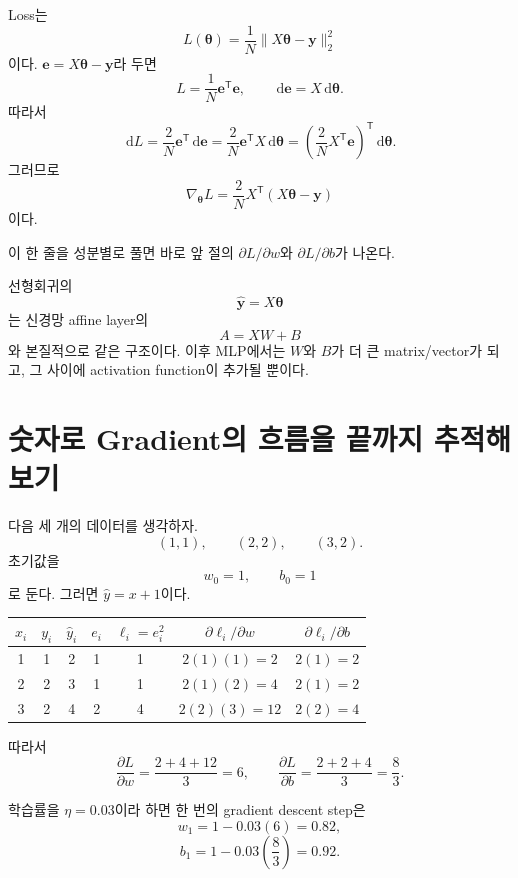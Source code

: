 \documentclass[11pt,a4paper]{article}
\newcommand{\grad}{\nabla}
\newcommand{\vect}[1]{\bm{#1}}
\newcommand{\T}{^{\mathsf T}}
\newcommand{\dd}{\,\mathrm d}
\begin{document}
Loss는
\[
L(\vect{\theta})
=
\frac1N\|X\vect{\theta}-\vect{y}\|_2^2
\]
이다. $\vect{e}=X\vect{\theta}-\vect{y}$라 두면
\[
L=\frac1N\vect{e}\T\vect{e},
\qquad
\dd\vect{e}=X\dd\vect{\theta}.
\]
따라서
\[
\dd L
=
\frac{2}{N}\vect{e}\T\dd\vect{e}
=
\frac{2}{N}\vect{e}\T X\dd\vect{\theta}
=
\left(\frac{2}{N}X\T\vect{e}\right)\T\dd\vect{\theta}.
\]
그러므로
\[
\boxed{
\grad_{\vect{\theta}}L
=
\frac{2}{N}X\T(X\vect{\theta}-\vect{y})
}
\]
이다.

이 한 줄을 성분별로 풀면 바로 앞 절의 $\partial L/\partial w$와 $\partial L/\partial b$가 나온다.

\begin{mlbox}[다음 단계와의 연결]
선형회귀의
\[
\widehat{\vect{y}}=X\vect{\theta}
\]
는 신경망 affine layer의
\[
A=XW+B
\]
와 본질적으로 같은 구조이다. 이후 MLP에서는 $W$와 $B$가 더 큰 matrix/vector가 되고,
그 사이에 activation function이 추가될 뿐이다.
\end{mlbox}

\section{숫자로 Gradient의 흐름을 끝까지 추적해 보기}

다음 세 개의 데이터를 생각하자.
\[
(1,1),\qquad(2,2),\qquad(3,2).
\]
초기값을
\[
w_0=1,\qquad b_0=1
\]
로 둔다. 그러면 $\widehat y=x+1$이다.

\begin{center}
\begin{tabular}{c|c|c|c|c|c|c}
\toprule
$x_i$ & $y_i$ & $\widehat y_i$ & $e_i$ & $\ell_i=e_i^2$ & $\partial\ell_i/\partial w$ & $\partial\ell_i/\partial b$\\
\midrule
1 & 1 & 2 & 1 & 1 & $2(1)(1)=2$ & $2(1)=2$\\
2 & 2 & 3 & 1 & 1 & $2(1)(2)=4$ & $2(1)=2$\\
3 & 2 & 4 & 2 & 4 & $2(2)(3)=12$ & $2(2)=4$\\
\bottomrule
\end{tabular}
\end{center}

따라서
\[
\frac{\partial L}{\partial w}
=
\frac{2+4+12}{3}=6,
\qquad
\frac{\partial L}{\partial b}
=
\frac{2+2+4}{3}=\frac{8}{3}.
\]

학습률을 $\eta=0.03$이라 하면 한 번의 gradient descent step은
\[
w_1=1-0.03(6)=0.82,
\]
\[
b_1=1-0.03\left(\frac83\right)=0.92.
\]
\end{document}
